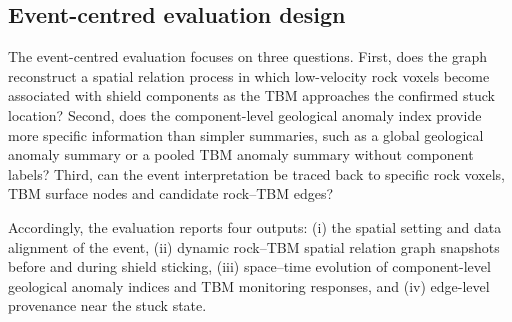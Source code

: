 \subsection{Event-centred evaluation design}
\label{sec:event-evaluation-design}

The event-centred evaluation focuses on three questions. First, does the graph reconstruct a spatial relation process in which low-velocity rock voxels become associated with shield components as the TBM approaches the confirmed stuck location? Second, does the component-level geological anomaly index provide more specific information than simpler summaries, such as a global geological anomaly summary or a pooled TBM anomaly summary without component labels? Third, can the event interpretation be traced back to specific rock voxels, TBM surface nodes and candidate rock--TBM edges?

Accordingly, the evaluation reports four outputs: (i) the spatial setting and data alignment of the event, (ii) dynamic rock--TBM spatial relation graph snapshots before and during shield sticking, (iii) space--time evolution of component-level geological anomaly indices and TBM monitoring responses, and (iv) edge-level provenance near the stuck state.